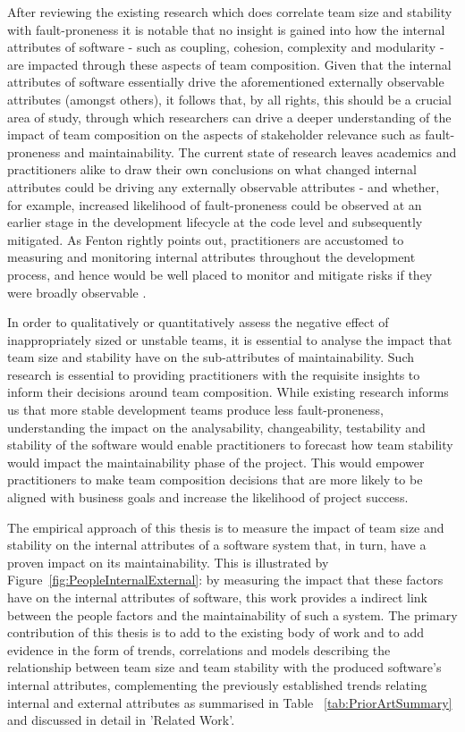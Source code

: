 After reviewing the existing research which does correlate team size and stability with fault-proneness it is notable that no insight is gained into how the internal attributes of software - such as coupling, cohesion, complexity and modularity - are impacted through these aspects of team composition. Given that the internal attributes of software essentially drive the aforementioned externally observable attributes (amongst others), it follows that, by all rights, this should be a crucial area of study, through which researchers can drive a deeper understanding of the impact of team composition on the aspects of stakeholder relevance such as fault-proneness and maintainability. The current state of research leaves academics and practitioners alike to draw their own conclusions on what changed internal attributes could be driving any externally observable attributes - and whether, for example, increased likelihood of fault-proneness could be observed at an earlier stage in the development lifecycle at the code level and subsequently mitigated.  As Fenton rightly points out, practitioners are accustomed to measuring and monitoring internal attributes throughout the development process, and hence would be well placed to monitor and mitigate risks if they were broadly observable \citep{fenton2014software}.

In order to qualitatively or quantitatively assess the negative effect of inappropriately sized or unstable teams, it is essential to analyse the impact that team size and stability have on the sub-attributes of maintainability. Such research is essential to providing practitioners with the requisite insights to inform their decisions around team composition. While existing research informs us that more stable development teams produce less fault-proneness, understanding the impact on the analysability, changeability, testability and stability of the software would enable practitioners to forecast how team stability would impact the maintainability phase of the project. This would empower practitioners to make team composition decisions that are more likely to be aligned with business goals and increase the likelihood of project success. 

The empirical approach of this thesis is to measure the impact of team size and stability on the internal attributes of a software system that, in turn, have a proven impact on its maintainability. This is illustrated by Figure~\ref{fig:PeopleInternalExternal}: by measuring the impact that these factors have on the internal attributes of software, this work provides a indirect link between the people factors and the maintainability of such a system. The primary contribution of this thesis is to add to the existing body of work and to add evidence in the form of trends, correlations and models describing the relationship between team size and team stability with the produced software's internal attributes, complementing the previously established trends relating internal and external attributes as summarised in Table ~\ref{tab:PriorArtSummary} and discussed in detail in 'Related Work'.  

